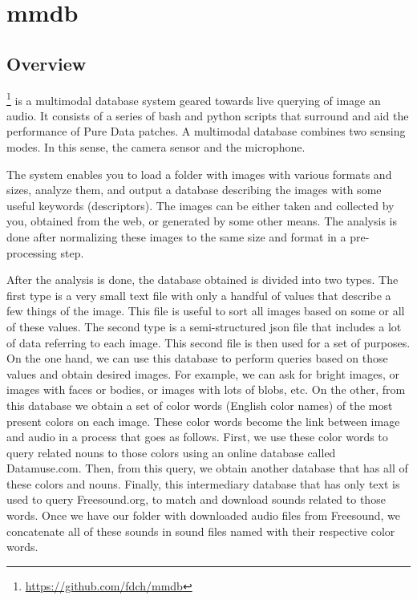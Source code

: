 \chapter{mmdb}

\section{Overview}

\footnote{\url{https://github.com/fdch/mmdb}} is a multimodal database system geared towards live querying of image an audio. It consists of a series of bash and python scripts that surround and aid the performance of Pure Data patches. A multimodal database combines two sensing modes. In this sense, the camera sensor and the microphone.

The system enables you to load a folder with images with various formats and sizes, analyze them, and output a database describing the images with some useful keywords (descriptors). The images can be either taken and collected by you, obtained from the web, or generated by some other means. The analysis is done after normalizing these images to the same size and format in a pre-processing step.

After the analysis is done, the database obtained is divided into two types. The first type is a very small text file with only a handful of values that describe a few things of the image. This file is useful to sort all images based on some or all of these values. The second type is a semi-structured \gls{json} file that includes a lot of data referring to each image. This second file is then used for a set of purposes. On the one hand, we can use this database to perform queries based on those values and obtain desired images. For example, we can ask for bright images, or images with faces or bodies, or images with lots of blobs, etc. On the other, from this database we obtain a set of color words (English color names) of the most present colors on each image. These color words become the link between image and audio in a process that goes as follows. First, we use these color words to query related nouns to those colors using an online database called Datamuse.com. Then, from this query, we obtain another database that has all of these colors and nouns. Finally, this intermediary database that has only text is used to query Freesound.org, to match and download sounds related to those words. Once we have our folder with downloaded audio files from Freesound, we concatenate all of these sounds in sound files named with their respective color words.

